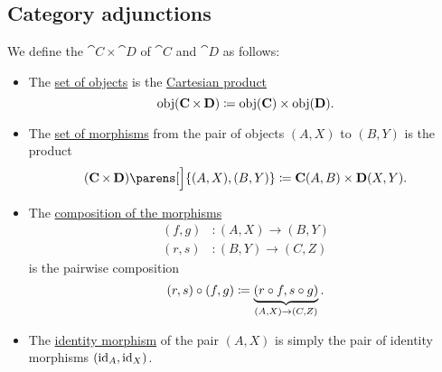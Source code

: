 \subsection{Category adjunctions}\label{subsec:category_adjunctions}

\begin{definition}\label{def:product_category}
  We define the  \( \cat{C} \times \cat{D} \) of \( \cat{C} \) and \( \cat{D} \) as follows:

  \begin{itemize}
    \item The \hyperref[def:category/objects]{set of objects} is the \hyperref[def:cartesian_product]{Cartesian product}
    \begin{equation}\label{eq:def:product_category/objects}
      \operatorname{obj}(\operatorname{\mathbf{C}} \times \operatorname{\mathbf{D}}) \coloneqq \operatorname{obj}(\operatorname{\mathbf{C}}) \times \operatorname{obj}(\operatorname{\mathbf{D}}).
    \end{equation}

    \item The \hyperref[def:category/morphisms]{set of morphisms} from the pair of objects \( (A, X) \) to \( (B, Y) \) is the product
    \begin{equation}\label{eq:def:product_category/morphisms}
      (\cat{C} \times \cat{D})\parens[\Big]{ (A, X), (B, Y) } \coloneqq \cat{C}(A, B) \times \cat{D}(X, Y).
    \end{equation}

    \item The \hyperref[def:category/composition]{composition of the morphisms}
    \begin{align*}
      (f, g)&: (A, X) \to (B, Y) \\
      (r, s)&: (B, Y) \to (C, Z)
    \end{align*}
    is the pairwise composition
    \begin{equation}\label{eq:def:product_category/composition}
      (r, s) \bincirc (f, g) \coloneqq \underbrace{(r \bincirc f, s \bincirc g)}_{(A, X) \to (C, Z)}.
    \end{equation}

    \item The \hyperref[def:category/identity]{identity morphism} of the pair \( (A, X) \) is simply the pair of identity morphisms \( (\operatorname{id}_A, \operatorname{id}_X) \).
  \end{itemize}
\end{definition}

